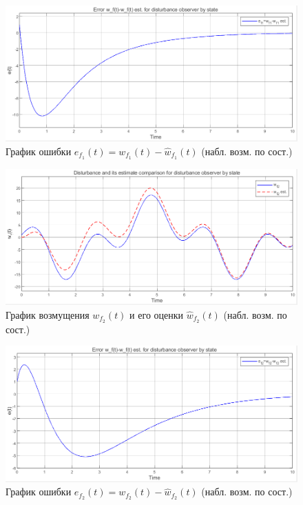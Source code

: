 \documentclass[a4paper, 12pt]{article}
\begin{document}
    \begin{figure}[H]
        \centering
        \includegraphics[scale=0.6]{3task_ef1.png}
        \captionsetup{skip=0pt}
        \caption{График ошибки $e_{f_1}(t)=w_{f_1}(t)-\hat{w}_{f_1}(t)$ (набл. возм. по сост.)}
        \label{fig:3task_ef1}
    \end{figure}
    \begin{figure}[H]
        \centering
        \includegraphics[scale=0.6]{3task_wfhwf2.png}
        \captionsetup{skip=0pt}
        \caption{График возмущения $w_{f_2}(t)$ и его оценки $\hat{w}_{f_2}(t)$ (набл. возм. по сост.)}
        \label{fig:3task_wfhwf2}
    \end{figure}
    \begin{figure}[H]
        \centering
        \includegraphics[scale=0.6]{3task_ef2.png}
        \captionsetup{skip=0pt}
        \caption{График ошибки $e_{f_2}(t)=w_{f_2}(t)-\hat{w}_{f_2}(t)$ (набл. возм. по сост.)}
        \label{fig:3task_ef2}
    \end{figure}
\end{document}
